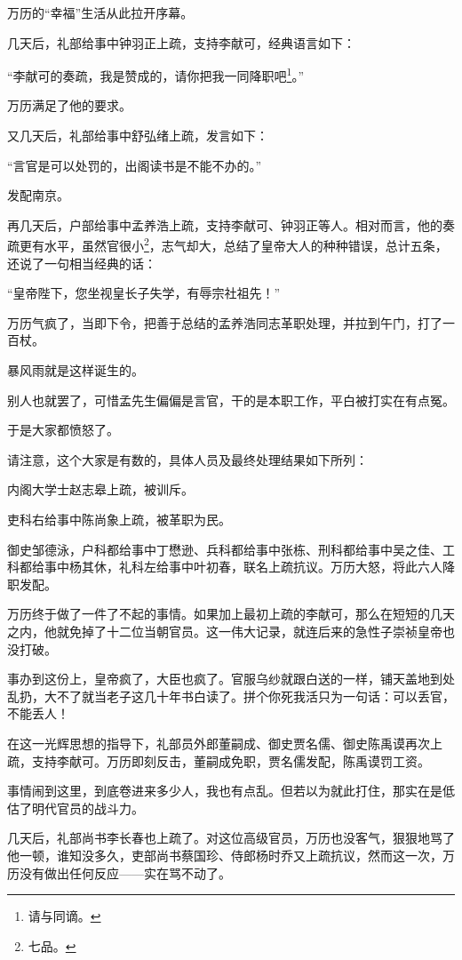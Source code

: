 \begin{multicols}{\theparacolNo}
		万历的“幸福”生活从此拉开序幕。

		几天后，礼部给事中钟羽正上疏，支持李献可，经典语言如下：

		“李献可的奏疏，我是赞成的，请你把我一同降职吧\footnote{请与同谪。}。”

		万历满足了他的要求。

		又几天后，礼部给事中舒弘绪上疏，发言如下：

		“言官是可以处罚的，出阁读书是不能不办的。”

		发配南京。

		再几天后，户部给事中孟养浩上疏，支持李献可、钟羽正等人。相对而言，他的奏疏更有水平，虽然官很小\footnote{七品。}，志气却大，总结了皇帝大人的种种错误，总计五条，还说了一句相当经典的话：

		“皇帝陛下，您坐视皇长子失学，有辱宗社祖先！”

		万历气疯了，当即下令，把善于总结的孟养浩同志革职处理，并拉到午门，打了一百杖。

		暴风雨就是这样诞生的。

		别人也就罢了，可惜孟先生偏偏是言官，干的是本职工作，平白被打实在有点冤。

		于是大家都愤怒了。

		请注意，这个大家是有数的，具体人员及最终处理结果如下所列：

		内阁大学士赵志皋上疏，被训斥。

		吏科右给事中陈尚象上疏，被革职为民。

		御史邹德泳，户科都给事中丁懋逊、兵科都给事中张栋、刑科都给事中吴之佳、工科都给事中杨其休，礼科左给事中叶初春，联名上疏抗议。万历大怒，将此六人降职发配。

		万历终于做了一件了不起的事情。如果加上最初上疏的李献可，那么在短短的几天之内，他就免掉了十二位当朝官员。这一伟大记录，就连后来的急性子崇祯皇帝也没打破。

		事办到这份上，皇帝疯了，大臣也疯了。官服乌纱就跟白送的一样，铺天盖地到处乱扔，大不了就当老子这几十年书白读了。拼个你死我活只为一句话：可以丢官，不能丢人！

		在这一光辉思想的指导下，礼部员外郎董嗣成、御史贾名儒、御史陈禹谟再次上疏，支持李献可。万历即刻反击，董嗣成免职，贾名儒发配，陈禹谟罚工资。

		事情闹到这里，到底卷进来多少人，我也有点乱。但若以为就此打住，那实在是低估了明代官员的战斗力。

		几天后，礼部尚书李长春也上疏了。对这位高级官员，万历也没客气，狠狠地骂了他一顿，谁知没多久，吏部尚书蔡国珍、侍郎杨时乔又上疏抗议，然而这一次，万历没有做出任何反应——实在骂不动了。


\end{multicols}
